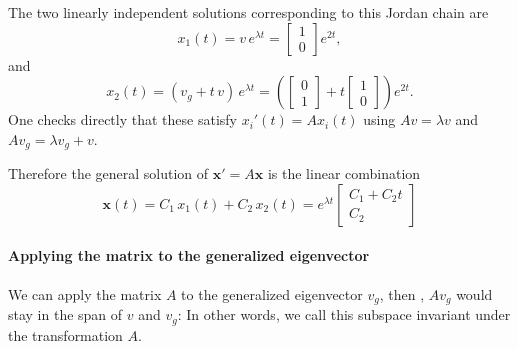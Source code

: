 \documentclass[11pt]{article}
\begin{document}
The two linearly independent solutions corresponding to this Jordan chain are
\begin{equation}
x_1(t)=v\,e^{\lambda t} = \begin{bmatrix}1\\[4pt]0\end{bmatrix} e^{2t}, \label{eq:sol1}
\end{equation}
and
\begin{equation}
x_2(t)=(v_g + t\,v)\,e^{\lambda t} = \left(\begin{bmatrix}0\\[4pt]1\end{bmatrix} + t\begin{bmatrix}1\\[4pt]0\end{bmatrix}\right)e^{2t}. \label{eq:sol2}
\end{equation}
One checks directly that these satisfy \(x_i'(t)=Ax_i(t)\) using \(Av=\lambda v\) and \(Av_g=\lambda v_g + v\).

Therefore the general solution of \(\mathbf{x}'=A\mathbf{x}\) is the linear combination
\begin{equation}
\mathbf{x}(t)=C_1\,x_1(t) + C_2\,x_2(t)
= e^{\lambda t} \begin{bmatrix}
C_1 + C_2 t \\[4pt] C_2
\end{bmatrix}
\end{equation}

\paragraph{Applying the matrix to the generalized eigenvector} We can apply the matrix \( A \) to the generalized eigenvector \( v_g \), then , $Av_g$ would stay in the span of $v$ and $v_g$: In other words, we call this subspace invariant under the transformation $A$.
\end{document}
